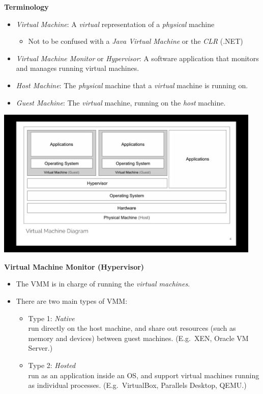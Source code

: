 \documentclass[11pt,a4paper]{article}
\begin{document}
\textbf{Terminology}
\begin{itemize}
    \item \emph{Virtual Machine}:
        A \emph{virtual} representation of a \emph{physical} machine
        \begin{itemize}
            \item Not to be confused with a \emph{Java Virtual Machine} or the \emph{CLR} (.NET)
        \end{itemize}
    \item \emph{Virtual Machine Monitor} or \emph{Hypervisor}:
        A software application that monitors and manages running virtual machines.
    \item \emph{Host Machine}:
        The \emph{physical} machine that a \emph{virtual} machine is running on.
    \item \emph{Guest Machine}:
        The \emph{virtual} machine, running on the \emph{host} machine.
\end{itemize}

\includegraphics[height=270]{virtual-machine-diagram.jpg}

\textbf{Virtual Machine Monitor (Hypervisor)}
\begin{itemize}
    \item The VMM is in charge of running the \emph{virtual machines}.
    \item There are two main types of VMM:\
        \begin{itemize}
            \item Type 1: \emph{Native} \\
                run directly on the host machine, and share out resources (such as
                memory and devices) between guest machines.
                (E.g.\ XEN, Oracle VM Server.)
            \item Type 2: \emph{Hosted} \\
                run as an application inside an OS, and support virtual machines running as
                individual processes.
                (E.g.\ VirtualBox, Parallels Desktop, QEMU.)
        \end{itemize}
\end{itemize}
\end{document}
